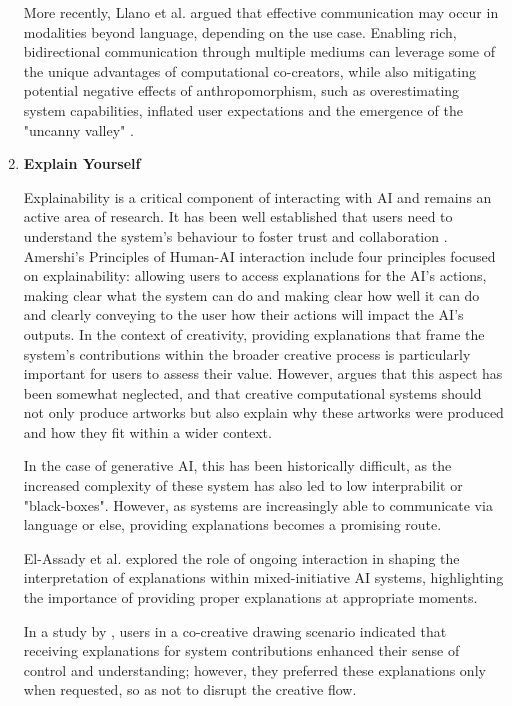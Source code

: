 \begin{enumerate}
More recently, Llano et al. \cite{Llano2022-ti} argued that effective communication may occur in modalities beyond language, depending on the use case. Enabling rich, bidirectional communication through multiple mediums can leverage some of the unique advantages of computational co-creators, while also mitigating potential negative effects of anthropomorphism, such as overestimating system capabilities, inflated user expectations and the emergence of the "uncanny valley" \cite{Shneiderman1997-tv, Suchman2006-bs, Shneiderman2020-ue, Moruzzi2020-mw}.
    
\item \textbf{Explain Yourself}

Explainability is a critical component of interacting with AI and remains an active area of research. It has been well established that users need to understand the system’s behaviour to foster trust and collaboration \cite{Shneiderman2020-wm, Zhu2018-zd, Llano2022-ti, El-Assady2022-qc}. Amershi's Principles of Human-AI interaction include four principles focused on explainability: allowing users to access explanations for the AI's actions, making clear what the system can do and making clear how well it can do and clearly conveying to the user how their actions will impact the AI's outputs. In the context of creativity, providing explanations that frame the system’s contributions within the broader creative process is particularly important for users to assess their value. However, \cite{Colton2012-jc} argues that this aspect has been somewhat neglected, and that creative computational systems should not only produce artworks but also explain why these artworks were produced and how they fit within a wider context.

In the case of generative AI, this has been historically difficult, as the increased complexity of these system has also led to low interprabilit or "black-boxes". However, as systems are increasingly able to communicate via language or else, providing explanations becomes a promising route. 

El-Assady et al. \cite{El-Assady2022-qc} explored the role of ongoing interaction in shaping the interpretation of explanations within mixed-initiative AI systems, highlighting the importance of providing proper explanations at appropriate moments. 

In a study by \cite{Oh2018-mu}, users in a co-creative drawing scenario indicated that receiving explanations for system contributions enhanced their sense of control and understanding; however, they preferred these explanations only when requested, so as not to disrupt the creative flow.


\end{enumerate}
